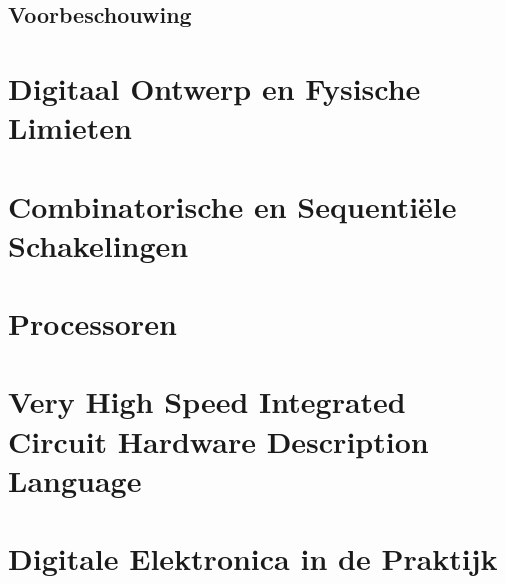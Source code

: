 \documentclass[a4paper,10pt,titlepage]{book}
\begin{document}
\chapter*{Voorbeschouwing}
\mainmatter
\part{Digitaal Ontwerp en Fysische Limieten}


\part{Combinatorische en Sequenti\"ele Schakelingen}


\part{Processoren}


\part{Very High Speed Integrated Circuit Hardware Description Language}

\part{Digitale Elektronica in de Praktijk}

\appendix
\end{document}
